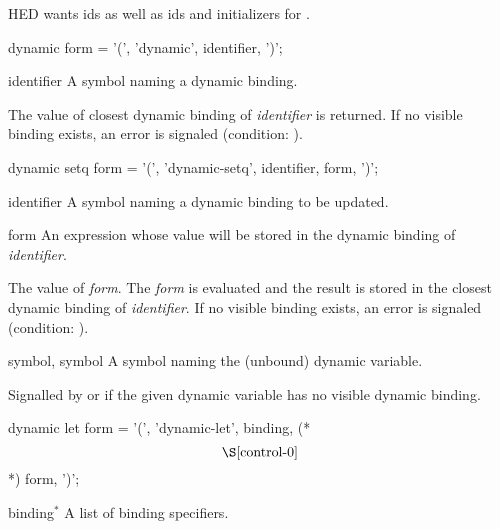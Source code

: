 \label{control-1}
%
\begin{optPrivate}
    HED wants ids as well as ids and initializers for .
\end{optPrivate}
%
\begin{optDefinition}
%
%
\Syntax
\savesyntax\dynamicSyntax\vbox{\small\syntax
dynamic form
   = '(', 'dynamic', identifier, ')';
\endsyntax}
%
\begin{arguments}
    \item[identifier] A symbol naming a dynamic binding.
\end{arguments}
%
\result%
The value of closest dynamic binding of {\em identifier} is returned.  If no
visible binding exists, an error is signaled (condition:
).

%
\Syntax
\savesyntax\dynamicSetqSyntax\vbox{\small\syntax
dynamic setq form
   = '(', 'dynamic-setq', identifier, form, ')';
\endsyntax}
%
\begin{arguments}
    \item[identifier] A symbol naming a dynamic binding to be updated.

    \item[form] An expression whose value will be stored in the dynamic binding
    of {\em identifier}.
\end{arguments}
%
\result%
The value of {\em form}.
%
\remarks%
The {\em form} is evaluated and the result is stored in the closest dynamic
binding of {\em identifier}.  If no visible binding exists, an error is signaled
(condition:
).

%
\begin{initoptions}
    \item[symbol, symbol] A symbol naming the (unbound) dynamic variable.
\end{initoptions}
%
\remarks%
Signalled by  or  if the given
dynamic variable has no visible dynamic binding.

%
\Syntax
\savesyntax\dynamicLetSyntax\vbox{\small\syntax
dynamic let form
   = '(', 'dynamic-let',
     {binding}, (* \[\S\ref{control-0}\] *)
     {form}, ')';
\endsyntax}
%
\begin{arguments}
    \item[binding\/$^*$] A list of binding specifiers.


\end{arguments}
\end{optDefinition}
